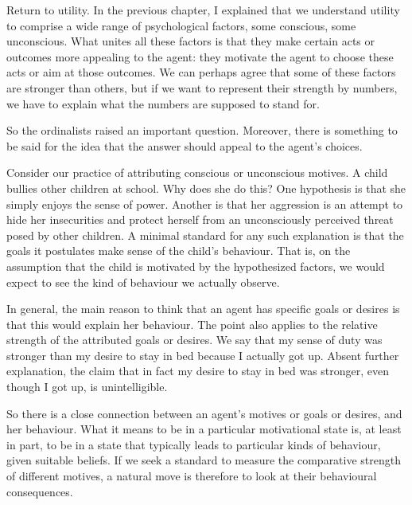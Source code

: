 Return to utility. In the previous chapter, I explained that we
understand utility to comprise a wide range of psychological factors,
some conscious, some unconscious. What unites all these factors is
that they make certain acts or outcomes more appealing to the agent:
they motivate the agent to choose these acts or aim at those
outcomes. We can perhaps agree that some of these factors are stronger
than others, but if we want to represent their strength by numbers, we
have to explain what the numbers are supposed to stand for.

So the ordinalists raised an important question. Moreover, there is
something to be said for the idea that the answer should appeal to
the agent's choices. 

Consider our practice of attributing conscious or unconscious
motives. A child bullies other children at school. Why does she do
this? One hypothesis is that she simply enjoys the sense of
power. Another is that her aggression is an attempt to hide her
insecurities and protect herself from an unconsciously perceived
threat posed by  other children. A minimal standard for any such
explanation is that the goals it postulates make sense of the child's
behaviour. That is, on the assumption that the child is motivated by
the hypothesized factors, we would expect to see the kind of behaviour
we actually observe.

In general, the main reason to think that an agent has specific goals
or desires is that this would explain her behaviour. The point also
applies to the relative strength of the attributed goals or
desires. We say that my sense of duty was stronger than my desire to
stay in bed because I actually got up. Absent further explanation, the
claim that in fact my desire to stay in bed was stronger, even though
I got up, is unintelligible.

So there is a close connection between an agent's motives or goals or
desires, and her behaviour. What it means to be in a particular
motivational state is, at least in part, to be in a state that
typically leads to particular kinds of behaviour, given suitable
beliefs. If we seek a standard to measure the comparative strength of
different motives, a natural move is therefore to look at their
behavioural consequences.


